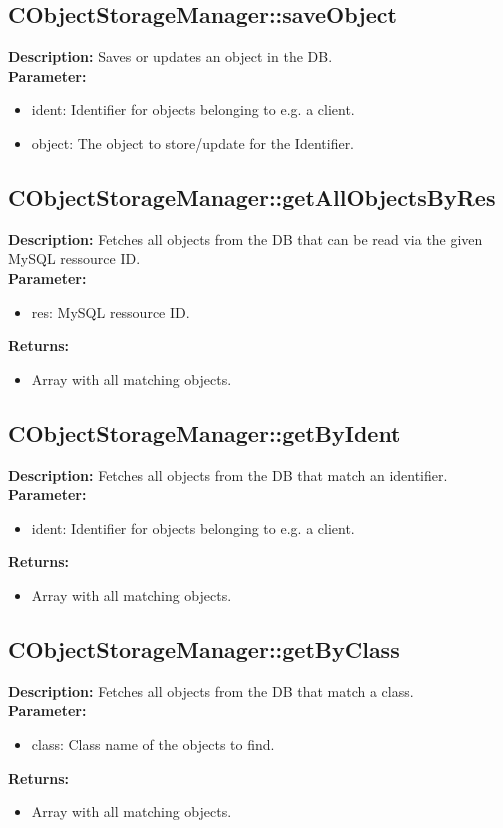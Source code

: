 \subsection{CObjectStorageManager::saveObject}
\textbf{Description:} Saves or updates an object in the DB.\\
\textbf{Parameter:}
\begin{itemize}
\item ident: Identifier for objects belonging to e.g. a client.
\item object: The object to store/update for the Identifier.
\end{itemize}

\subsection{CObjectStorageManager::getAllObjectsByRes}
\textbf{Description:} Fetches all objects from the DB that can be read via the given MySQL ressource ID.\\
\textbf{Parameter:}
\begin{itemize}
\item res: MySQL ressource ID.
\end{itemize}
\textbf{Returns:}
\begin{itemize}
\item Array with all matching objects.
\end{itemize}

\subsection{CObjectStorageManager::getByIdent}
\textbf{Description:} Fetches all objects from the DB that match an identifier.\\
\textbf{Parameter:}
\begin{itemize}
\item ident: Identifier for objects belonging to e.g. a client.
\end{itemize}
\textbf{Returns:}
\begin{itemize}
\item Array with all matching objects.
\end{itemize}

\subsection{CObjectStorageManager::getByClass}
\textbf{Description:} Fetches all objects from the DB that match a class.\\
\textbf{Parameter:}
\begin{itemize}
\item class: Class name of the objects to find.
\end{itemize}
\textbf{Returns:}
\begin{itemize}
\item Array with all matching objects.
\end{itemize}

